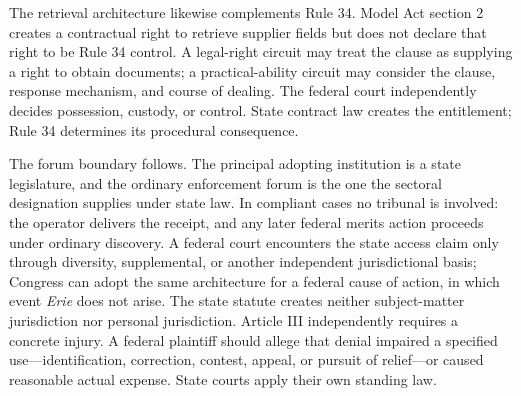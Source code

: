 The retrieval architecture likewise complements Rule 34. Model Act section 2 creates a contractual right to retrieve supplier fields but does not declare that right to be Rule 34 control. A legal-right circuit may treat the clause as supplying a right to obtain documents; a practical-ability circuit may consider the clause, response mechanism, and course of dealing. The federal court independently decides possession, custody, or control. State contract law creates the entitlement; Rule 34 determines its procedural consequence.

The forum boundary follows. The principal adopting institution is a state legislature, and the ordinary enforcement forum is the one the sectoral designation supplies under state law. In compliant cases no tribunal is involved: the operator delivers the receipt, and any later federal merits action proceeds under ordinary discovery. A federal court encounters the state access claim only through diversity, supplemental, or another independent jurisdictional basis; Congress can adopt the same architecture for a federal cause of action, in which event \emph{Erie} does not arise. The state statute creates neither subject-matter jurisdiction nor personal jurisdiction. Article III independently requires a concrete injury. A federal plaintiff should allege that denial impaired a specified use---identification, correction, contest, appeal, or pursuit of relief---or caused reasonable actual expense. State courts apply their own standing law.


